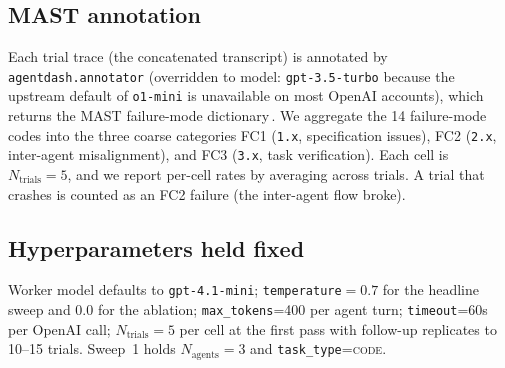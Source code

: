 \subsection{MAST annotation}

Each trial trace (the concatenated transcript) is annotated by
\texttt{agentdash.annotator} (overridden to model: \texttt{gpt-3.5-turbo}
because the upstream default of \texttt{o1-mini} is unavailable on most
OpenAI accounts), which returns the MAST failure-mode
dictionary\,\cite{mast2024}. We aggregate the 14 failure-mode codes into
the three coarse categories FC1 (\texttt{1.x}, specification issues), FC2 (\texttt{2.x},
inter-agent misalignment), and FC3 (\texttt{3.x}, task verification). Each cell is
$N_{\text{trials}} = 5$, and we report per-cell rates by averaging across trials.
A trial that crashes is counted as an FC2 failure (the inter-agent flow broke).

\subsection{Hyperparameters held fixed}

Worker model defaults to \texttt{gpt-4.1-mini};
\texttt{temperature}$=0.7$ for the headline sweep and $0.0$ for the
ablation; \texttt{max\_tokens}=400 per agent turn; \texttt{timeout}=60s
per OpenAI call; $N_{\text{trials}}=5$ per cell at the first pass with
follow-up replicates to 10--15 trials. Sweep~1 holds
$N_{\text{agents}}=3$ and \texttt{task\_type}=\textsc{code}.
